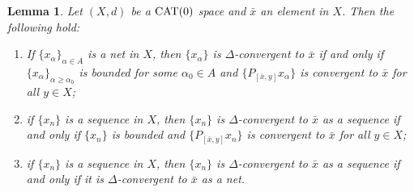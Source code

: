 \documentclass[draft]{amsart}
\numberwithin{equation}{section}
\newcommand{\CAT}{\textup{CAT}}
\theoremstyle{plain}
\newtheorem{lemma}[theorem]{Lemma}
\theoremstyle{definition}
\theoremstyle{remark}
\begin{document}
\begin{lemma}\label{lem:Delta-net}
 Let $(X,d)$ be a $\CAT(0)$ space and $\bar{x}$ an element in $X$. 
 Then the following hold: 
 \begin{enumerate}
  \item[(i)] If $\{x_{\alpha}\}_{\alpha\in A}$ is a net in $X$, 
 then $\{x_{\alpha}\}$ is $\Delta$-convergent to $\bar{x}$ 
 if and only if 
 $\{x_{\alpha}\}_{\alpha \geq \alpha_0}$ is bounded 
 for some $\alpha_0\in A$ and 
 $\{P_{[\bar{x},y]}x_{\alpha}\}$ is convergent to $\bar{x}$ 
 for all $y\in X$; 
  \item[(ii)] if $\{x_{n}\}$ is a sequence in $X$, 
 then $\{x_{n}\}$ is $\Delta$-convergent to $\bar{x}$ 
 as a sequence  
 if and only if 
 $\{x_{n}\}$ is bounded and 
 $\{P_{[\bar{x},y]}x_{n}\}$ is convergent to $\bar{x}$ 
 for all $y\in X$; 
  \item[(iii)] if $\{x_{n}\}$ is a sequence in $X$, 
 then $\{x_{n}\}$ is $\Delta$-convergent to $\bar{x}$ 
 as a sequence  
 if and only if 
 it is $\Delta$-convergent to $\bar{x}$ 
 as a net. 
 \end{enumerate}
\end{lemma}
\end{document}
